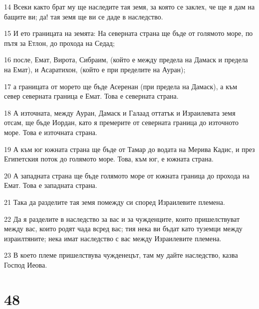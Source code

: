 \par 14 Всеки както брат му ще наследите тая земя, за която се заклех, че ще я дам на бащите ви; да! тая земя ще ви се даде в наследство.
\par 15 И ето границата на земята: На северната страна ще бъде от голямото море, по пътя за Етлон, до прохода на Седад;
\par 16 после, Емат, Вирота, Сибраим, (който е между предела на Дамаск и предела на Емат), и Асаратихон, (който е при пределите на Ауран);
\par 17 а границата от морето ще бъде Асеренан (при предела на Дамаск), а към север северната граница е Емат. Това е северната страна.
\par 18 А източната, между Ауран, Дамаск и Галаад оттатък и Израилевата земя отсам, ще бъде Иордан, като я премерите от северната граница до източното море. Това е източната страна.
\par 19 А към юг южната страна ще бъде от Тамар до водата на Мерива Кадис, и през Египетския поток до голямото море. Това, към юг, е южната страна.
\par 20 А западната страна ще бъде голямото море от южната граница до прохода на Емат. Това е западната страна.
\par 21 Така да разделите тая земя помежду си според Израилевите племена.
\par 22 Да я разделите в наследство за вас и за чужденците, които пришелствуват между вас, които родят чада всред вас; тия нека ви бъдат като туземци между израилтяните; нека имат наследство с вас между Израилевите племена.
\par 23 В което племе пришелствува чужденецът, там му дайте наследство, казва Господ Иеова.

\chapter{48}

